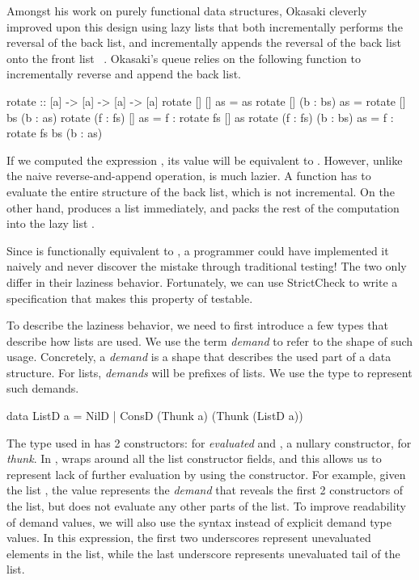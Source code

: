 \documentclass[acmsmall,review]{acmart}\settopmatter{}
\begin{document}
Amongst his work on purely functional data structures\cite{Okasaki},
Okasaki cleverly improved upon this design using lazy lists that both
incrementally performs the reversal of the back list, and
incrementally appends the reversal of the back list onto the front
list ~\cite{Okasaki95simpleand}. Okasaki's queue relies on the
following  function to incrementally reverse and append the
back list.
\begin{inlinecode}
  rotate :: [a] -> [a] -> [a] -> [a]
  rotate      []       []  as =                       as
  rotate      []  (b : bs) as =     rotate [] bs (b : as)
  rotate (f : fs)      []  as = f : rotate fs []      as
  rotate (f : fs) (b : bs) as = f : rotate fs bs (b : as)
\end{inlinecode}
If we computed the expression , its value
will be equivalent to . However, unlike
the naive reverse-and-append operation,  is much
lazier. A  function has to evaluate the entire structure
of the back list, which is not incremental. On the other
hand,  produces a list immediately, and packs the rest of
the computation into the lazy list .

Since  is functionally equivalent to , a programmer could have implemented it naively and never
discover the mistake through traditional testing! The two only differ
in their laziness behavior. Fortunately, we can use StrictCheck to
write a specification that makes this property of 
testable.

To describe the laziness behavior, we need to first introduce a few
types that describe how lists are used. We use the
term \textit{demand} to refer to the shape of such usage. Concretely,
a \textit{demand} is a shape that describes the used part of a data
structure. For lists, \textit{demands} will be prefixes of lists. We
use the type  to represent such demands.
%
\begin{inlinecode}
  data ListD a = NilD
               | ConsD (Thunk a) (Thunk (ListD a))
\end{inlinecode}
%
The  type used in  has 2 constructors: 
for \textit{evaluated} and , a nullary constructor,
for \textit{thunk}. In ,  wraps around all the
list constructor fields, and this allows us to represent lack of
further evaluation by using the  constructor. For example, given
the list \lk{[1, 2, 3]}, the value  represents
the \textit{demand} that reveals the first 2  constructors of
the list, but does not evaluate any other parts of the list. To
improve readability of demand values, we will also use the
syntax \lk{\_ : \_ : \_} instead of explicit demand type values. In
this expression, the first two underscores represent unevaluated
elements in the list, while the last underscore represents unevaluated
tail of the list.
\end{document}
